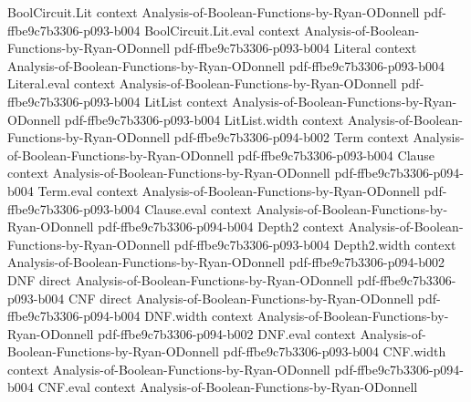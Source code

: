\begin{lemma}
\leanok
{}
\proofstep
  {BoolCircuit.Lit}
  {context}
  {Analysis-of-Boolean-Functions-by-Ryan-ODonnell}
  {pdf-ffbe9c7b3306-p093-b004}
\proofstep
  {BoolCircuit.Lit.eval}
  {context}
  {Analysis-of-Boolean-Functions-by-Ryan-ODonnell}
  {pdf-ffbe9c7b3306-p093-b004}
\proofstep
  {Literal}
  {context}
  {Analysis-of-Boolean-Functions-by-Ryan-ODonnell}
  {pdf-ffbe9c7b3306-p093-b004}
\proofstep
  {Literal.eval}
  {context}
  {Analysis-of-Boolean-Functions-by-Ryan-ODonnell}
  {pdf-ffbe9c7b3306-p093-b004}
\proofstep
  {LitList}
  {context}
  {Analysis-of-Boolean-Functions-by-Ryan-ODonnell}
  {pdf-ffbe9c7b3306-p093-b004}
\proofstep
  {LitList.width}
  {context}
  {Analysis-of-Boolean-Functions-by-Ryan-ODonnell}
  {pdf-ffbe9c7b3306-p094-b002}
\proofstep
  {Term}
  {context}
  {Analysis-of-Boolean-Functions-by-Ryan-ODonnell}
  {pdf-ffbe9c7b3306-p093-b004}
\proofstep
  {Clause}
  {context}
  {Analysis-of-Boolean-Functions-by-Ryan-ODonnell}
  {pdf-ffbe9c7b3306-p094-b004}
\proofstep
  {Term.eval}
  {context}
  {Analysis-of-Boolean-Functions-by-Ryan-ODonnell}
  {pdf-ffbe9c7b3306-p093-b004}
\proofstep
  {Clause.eval}
  {context}
  {Analysis-of-Boolean-Functions-by-Ryan-ODonnell}
  {pdf-ffbe9c7b3306-p094-b004}
\proofstep
  {Depth2}
  {context}
  {Analysis-of-Boolean-Functions-by-Ryan-ODonnell}
  {pdf-ffbe9c7b3306-p093-b004}
\proofstep
  {Depth2.width}
  {context}
  {Analysis-of-Boolean-Functions-by-Ryan-ODonnell}
  {pdf-ffbe9c7b3306-p094-b002}
\proofstep
  {DNF}
  {direct}
  {Analysis-of-Boolean-Functions-by-Ryan-ODonnell}
  {pdf-ffbe9c7b3306-p093-b004}
\proofstep
  {CNF}
  {direct}
  {Analysis-of-Boolean-Functions-by-Ryan-ODonnell}
  {pdf-ffbe9c7b3306-p094-b004}
\proofstep
  {DNF.width}
  {context}
  {Analysis-of-Boolean-Functions-by-Ryan-ODonnell}
  {pdf-ffbe9c7b3306-p094-b002}
\proofstep
  {DNF.eval}
  {context}
  {Analysis-of-Boolean-Functions-by-Ryan-ODonnell}
  {pdf-ffbe9c7b3306-p093-b004}
\proofstep
  {CNF.width}
  {context}
  {Analysis-of-Boolean-Functions-by-Ryan-ODonnell}
  {pdf-ffbe9c7b3306-p094-b004}
\proofstep
  {CNF.eval}
  {context}
  {Analysis-of-Boolean-Functions-by-Ryan-ODonnell}

\end{lemma}
